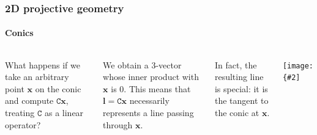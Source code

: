 \documentclass[aspectratio=169]{beamer}
\renewcommand{\vec}[1]{\boldsymbol{#1}}
\newcommand{\mat}[1]{\mathtt{#1}}
\newcommand{\myfig}[3]{\centerline{\texttt{[image: \{\#2]}}}
\begin{document}
\begin{frame}
\frametitle{2D projective geometry}
\framesubtitle{Conics}

\begin{columns}

\column{2.2in}

What happens if we take an arbitrary point $\vec{x}$ on the conic and
compute $\mat{C}\vec{x}$, treating $\mat{C}$ as a \alert{linear
  operator}?

\medskip

We obtain a 3-vector whose inner product with $\vec{x}$ is 0.  This
means that $\vec{l}=\mat{C}\vec{x}$ necessarily represents a
\alert{line passing through $\vec{x}$}.

\medskip

In fact, the resulting line is special: it is the \alert{tangent} to
the conic at $\vec{x}$.

\column{2.3in}

\myfig{1.9in}{HZ-fig1-2b}{
  \parbox{2.3in}{
    \begin{center}
      The line $\vec{l}=\mat{C}\vec{x}$ is the tangent to $\mat{C}$
      through $\vec{x}$.\\
      \mbox{\hspace{0.2in}} \\
      Hartley and Zisserman (2004), Fig. 2.2(b) \end{center}}}

\end{columns}

\end{frame}
\end{document}
